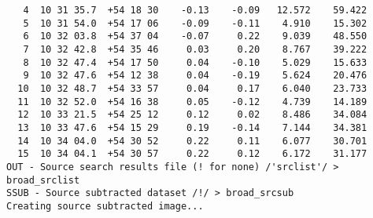 \begin{verbatim}
   4  10 31 35.7  +54 18 30    -0.13    -0.09   12.572    59.422
   5  10 31 54.0  +54 17 06    -0.09    -0.11    4.910    15.302
   6  10 32 03.8  +54 37 04    -0.07     0.22    9.039    48.550
   7  10 32 42.8  +54 35 46     0.03     0.20    8.767    39.222
   8  10 32 47.4  +54 17 50     0.04    -0.10    5.029    15.633
   9  10 32 47.6  +54 12 38     0.04    -0.19    5.624    20.476
  10  10 32 48.7  +54 33 57     0.04     0.17    6.040    23.733
  11  10 32 52.0  +54 16 38     0.05    -0.12    4.739    14.189
  12  10 33 21.5  +54 25 12     0.12     0.02    8.486    34.084
  13  10 33 47.6  +54 15 29     0.19    -0.14    7.144    34.381
  14  10 34 04.0  +54 30 52     0.22     0.11    6.077    30.701
  15  10 34 04.1  +54 30 57     0.22     0.12    6.172    31.177
OUT - Source search results file (! for none) /'srclist'/ > broad_srclist
SSUB - Source subtracted dataset /!/ > broad_srcsub
Creating source subtracted image...
\end{verbatim}

